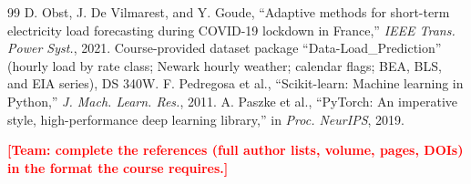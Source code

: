 \documentclass[10pt,letterpaper,twocolumn]{article}
\newcommand{\todo}[1]{\textcolor{red}{\textbf{[Team: #1]}}}
\begin{document}
\begin{thebibliography}{99}
 D. Obst, J. De Vilmarest, and Y. Goude, ``Adaptive methods for short-term electricity load forecasting during COVID-19 lockdown in France,'' \textit{IEEE Trans. Power Syst.}, 2021.
 Course-provided dataset package ``Data-Load\_Prediction'' (hourly load by rate class; Newark hourly weather; calendar flags; BEA, BLS, and EIA series), DS 340W.
 F. Pedregosa et al., ``Scikit-learn: Machine learning in Python,'' \textit{J. Mach. Learn. Res.}, 2011.
 A. Paszke et al., ``PyTorch: An imperative style, high-performance deep learning library,'' in \textit{Proc. NeurIPS}, 2019.
\end{thebibliography}
\todo{complete the references (full author lists, volume, pages, DOIs) in the format the course requires.}
\end{document}
